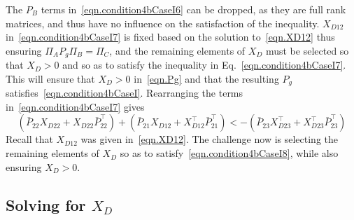 The $P_{B}$ terms in\ \eqref{eqn.condition4bCaseI6} can be dropped, as they are full rank matrices, and thus have no influence on the satisfaction of the inequality.
$X_{D12}$ in\ \eqref{eqn.condition4bCaseI7} is fixed based on the solution to\ \eqref{eqn.XD12} thus ensuring $\Pi_{A}P_{g}\Pi_{B}=\Pi_{C}$, and the remaining elements of $X_{D}$ must be selected so that $X_{D}>0$ and so as to satisfy the inequality in Eq.\ \eqref{eqn.condition4bCaseI7}.
This will ensure that $X_{D}>0$ in\ \eqref{eqn.Pg} and that the resulting $P_{g}$ satisfies\ \eqref{eqn.condition4bCaseI}.
Rearranging the terms in\ \eqref{eqn.condition4bCaseI7} gives
\begin{equation}
  \label{eqn.condition4bCaseI8}
  (\bar{P}_{22}X_{D22} + X_{D22}\bar{P}_{22}^{\top})
  +(\bar{P}_{21}X_{D12} + X_{D12}^{\top}\bar{P}_{21}^{\top})
  <
  -(\bar{P}_{23}X_{D23}^{\top} + X_{D23}^{\top}\bar{P}_{23}^{\top})
\end{equation}
Recall that $X_{D12}$ was given in\ \eqref{eqn.XD12}.
The challenge now is selecting the remaining elements of $X_{D}$ so as to satisfy\ \eqref{eqn.condition4bCaseI8}, while also ensuring $X_{D}>0$.

\subsection{Solving for $X_{D}$}

